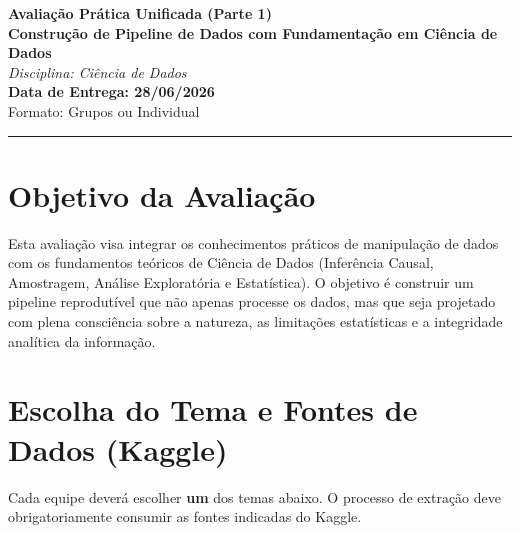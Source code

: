 \documentclass[12pt,a4paper]{article}
\begin{document}
	
	\noindent
	\begin{center}
		\LARGE \textbf{Avaliação Prática Unificada (Parte 1)} \\
		\vspace{0.2cm}
		\large \textbf{Construção de Pipeline de Dados com Fundamentação em Ciência de Dados} \\
		\vspace{0.4cm}
		\normalsize \textit{Disciplina: Ciência de Dados} \\
		\textbf{Data de Entrega: 28/06/2026} \\
		\normalsize Formato: Grupos ou Individual
	\end{center}
	
	\vspace{0.2cm}
	\noindent\rule{\textwidth}{0.4pt}
	\vspace{0.5cm}
	
	\section{Objetivo da Avaliação}
	Esta avaliação visa integrar os conhecimentos práticos de manipulação de dados com os fundamentos teóricos de Ciência de Dados (Inferência Causal, Amostragem, Análise Exploratória e Estatística). O objetivo é construir um pipeline reprodutível que não apenas processe os dados, mas que seja projetado com plena consciência sobre a natureza, as limitações estatísticas e a integridade analítica da informação.
	
	\section{Escolha do Tema e Fontes de Dados (Kaggle)}
	Cada equipe deverá escolher \textbf{um} dos temas abaixo. O processo de extração deve obrigatoriamente consumir as fontes indicadas do Kaggle.
	
\end{document}
